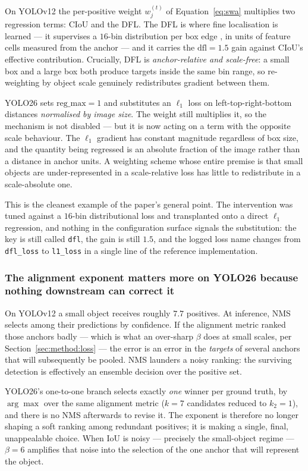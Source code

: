 \documentclass[10pt,twocolumn,a4paper]{article}
\begin{document}
On YOLOv12 the per-positive weight $w_j^{(t)}$ of Equation~\eqref{eq:swa}
multiplies two regression terms: CIoU and the DFL. The DFL is where fine
localisation is learned --- it supervises a $16$-bin distribution per box edge \cite{li2020gfl},
in units of feature cells measured from the anchor --- and it carries the
$\mathrm{dfl}=1.5$ gain against CIoU's effective contribution. Crucially, DFL is
\emph{anchor-relative and scale-free}: a small box and a large box both produce
targets inside the same bin range, so re-weighting by object scale genuinely
redistributes gradient between them.

YOLO26 sets $\mathrm{reg\_max}=1$ and substitutes an $\ell_1$ loss on
left-top-right-bottom distances \emph{normalised by image size}. The weight still
multiplies it, so the mechanism is not disabled --- but it is now acting on a
term with the opposite scale behaviour. The $\ell_1$ gradient has constant
magnitude regardless of box size, and the quantity being regressed is an absolute
fraction of the image rather than a distance in anchor units. A weighting scheme
whose entire premise is that small objects are under-represented in a
scale-relative loss has little to redistribute in a scale-absolute one.

This is the cleanest example of the paper's general point. The intervention was
tuned against a $16$-bin distributional loss and transplanted onto a direct
$\ell_1$ regression, and nothing in the configuration surface signals the
substitution: the key is still called \texttt{dfl}, the gain is still $1.5$, and
the logged loss name changes from \texttt{dfl\_loss} to \texttt{l1\_loss} in a
single line of the reference implementation.

\subsubsection{The alignment exponent matters more on YOLO26 because nothing
downstream can correct it}

On YOLOv12 a small object receives roughly $7.7$ positives. At inference, NMS
selects among their predictions by confidence. If the alignment metric ranked
those anchors badly --- which is what an over-sharp $\beta$ does at small scales,
per Section~\ref{sec:method:loss} --- the error is an error in the \emph{targets}
of several anchors that will subsequently be pooled. NMS launders a noisy
ranking: the surviving detection is effectively an ensemble decision over the
positive set.

YOLO26's one-to-one branch selects exactly \emph{one} winner per ground truth,
by $\arg\max$ over the same alignment metric ($k=7$ candidates reduced to
$k_2=1$), and there is no NMS afterwards to revise it. The exponent is therefore
no longer shaping a soft ranking among redundant positives; it is making a
single, final, unappealable choice. When IoU is noisy --- precisely the
small-object regime --- $\beta=6$ amplifies that noise into the selection of the
one anchor that will represent the object.
\end{document}
